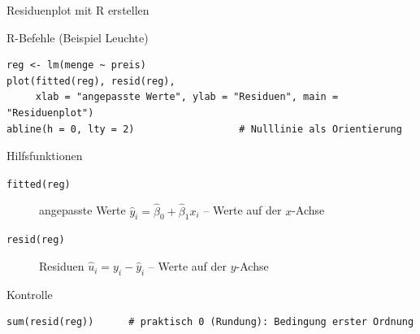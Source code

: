 \documentclass[aspectratio=169,11pt]{beamer}
\begin{document}
\begin{frame}[fragile]{Residuenplot mit R erstellen}
  \small\lstset{basicstyle=\ttfamily\footnotesize,aboveskip=3pt,belowskip=3pt}
  \begin{block}{R-Befehle (Beispiel Leuchte)}
\begin{lstlisting}
reg <- lm(menge ~ preis)
plot(fitted(reg), resid(reg),
     xlab = "angepasste Werte", ylab = "Residuen", main = "Residuenplot")
abline(h = 0, lty = 2)                  # Nulllinie als Orientierung
\end{lstlisting}
  \end{block}

  \begin{block}{Hilfsfunktionen}
    \begin{description}
      \item[\texttt{fitted(reg)}] angepasste Werte
            $\hat{y}_i = \hat{\beta}_0 + \hat{\beta}_1 x_i$ -- Werte auf der $x$-Achse
      \item[\texttt{resid(reg)}] Residuen $\hat{u}_i = y_i - \hat{y}_i$ --
            Werte auf der $y$-Achse
    \end{description}
  \end{block}

  \begin{exampleblock}{Kontrolle}
\begin{lstlisting}
sum(resid(reg))      # praktisch 0 (Rundung): Bedingung erster Ordnung
\end{lstlisting}
  \end{exampleblock}
\end{frame}
\end{document}
